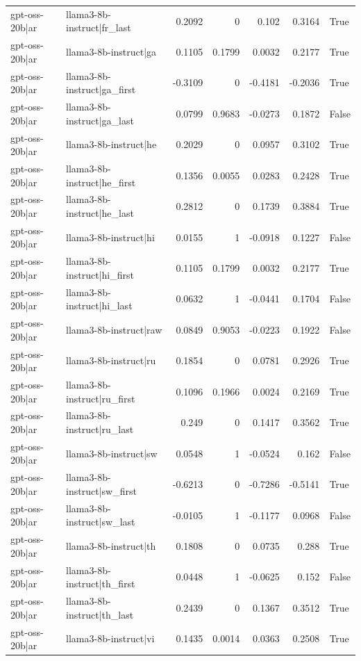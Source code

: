 \begin{table}
\begin{tabular}{l l r r r r l}
gpt-oss-20b|ar & llama3-8b-instruct|fr_last & 0.2092 & 0 & 0.102 & 0.3164 & True \\
gpt-oss-20b|ar & llama3-8b-instruct|ga & 0.1105 & 0.1799 & 0.0032 & 0.2177 & True \\
gpt-oss-20b|ar & llama3-8b-instruct|ga_first & -0.3109 & 0 & -0.4181 & -0.2036 & True \\
gpt-oss-20b|ar & llama3-8b-instruct|ga_last & 0.0799 & 0.9683 & -0.0273 & 0.1872 & False \\
gpt-oss-20b|ar & llama3-8b-instruct|he & 0.2029 & 0 & 0.0957 & 0.3102 & True \\
gpt-oss-20b|ar & llama3-8b-instruct|he_first & 0.1356 & 0.0055 & 0.0283 & 0.2428 & True \\
gpt-oss-20b|ar & llama3-8b-instruct|he_last & 0.2812 & 0 & 0.1739 & 0.3884 & True \\
gpt-oss-20b|ar & llama3-8b-instruct|hi & 0.0155 & 1 & -0.0918 & 0.1227 & False \\
gpt-oss-20b|ar & llama3-8b-instruct|hi_first & 0.1105 & 0.1799 & 0.0032 & 0.2177 & True \\
gpt-oss-20b|ar & llama3-8b-instruct|hi_last & 0.0632 & 1 & -0.0441 & 0.1704 & False \\
gpt-oss-20b|ar & llama3-8b-instruct|raw & 0.0849 & 0.9053 & -0.0223 & 0.1922 & False \\
gpt-oss-20b|ar & llama3-8b-instruct|ru & 0.1854 & 0 & 0.0781 & 0.2926 & True \\
gpt-oss-20b|ar & llama3-8b-instruct|ru_first & 0.1096 & 0.1966 & 0.0024 & 0.2169 & True \\
gpt-oss-20b|ar & llama3-8b-instruct|ru_last & 0.249 & 0 & 0.1417 & 0.3562 & True \\
gpt-oss-20b|ar & llama3-8b-instruct|sw & 0.0548 & 1 & -0.0524 & 0.162 & False \\
gpt-oss-20b|ar & llama3-8b-instruct|sw_first & -0.6213 & 0 & -0.7286 & -0.5141 & True \\
gpt-oss-20b|ar & llama3-8b-instruct|sw_last & -0.0105 & 1 & -0.1177 & 0.0968 & False \\
gpt-oss-20b|ar & llama3-8b-instruct|th & 0.1808 & 0 & 0.0735 & 0.288 & True \\
gpt-oss-20b|ar & llama3-8b-instruct|th_first & 0.0448 & 1 & -0.0625 & 0.152 & False \\
gpt-oss-20b|ar & llama3-8b-instruct|th_last & 0.2439 & 0 & 0.1367 & 0.3512 & True \\
gpt-oss-20b|ar & llama3-8b-instruct|vi & 0.1435 & 0.0014 & 0.0363 & 0.2508 & True \\

\end{tabular}
\end{table}
